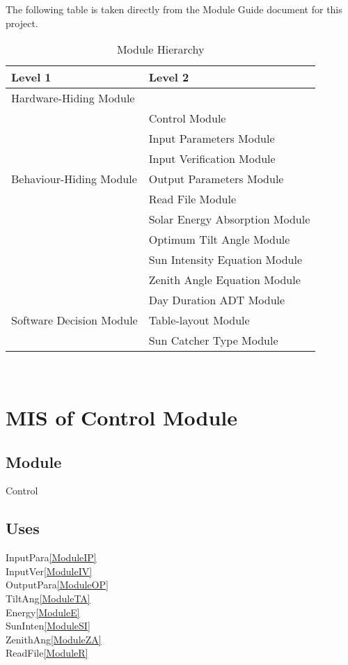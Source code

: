 \documentclass[12pt, titlepage]{article}
\begin{document}
The following table is taken directly from the Module Guide document for this
project.

\begin{table}[h!]
\centering
\begin{tabular}{p{} p{}}
\toprule
\textbf{Level 1} & \textbf{Level 2}\\
\midrule

{Hardware-Hiding Module} & ~ \\
\midrule

\multirow{7}{0.3\textwidth}{Behaviour-Hiding
 Module}& Control Module\\
& Input Parameters Module\\
& Input Verification Module\\
& Output Parameters Module\\
& Read File Module\\
& Solar Energy Absorption Module\\
& Optimum Tilt Angle Module\\
& Sun Intensity Equation Module\\
& Zenith Angle Equation Module\\
\midrule

\multirow{3}{0.3\textwidth}{Software Decision Module} 
& Day Duration ADT Module\\
& Table-layout Module\\
& Sun Catcher Type 
Module\\
\bottomrule

\end{tabular}
\caption{Module Hierarchy}
\label{TblMH}
\end{table}

\newpage
~\newpage


\section{MIS of Control Module} \label{ModuleC} 

\subsection{Module}
Control

\subsection{Uses}
InputPara\ref{ModuleIP}\\
InputVer\ref{ModuleIV}\\
OutputPara\ref{ModuleOP}\\
TiltAng\ref{ModuleTA}\\
Energy\ref{ModuleE}\\
SunInten\ref{ModuleSI}\\
ZenithAng\ref{ModuleZA}\\
ReadFile\ref{ModuleR}
\end{document}
